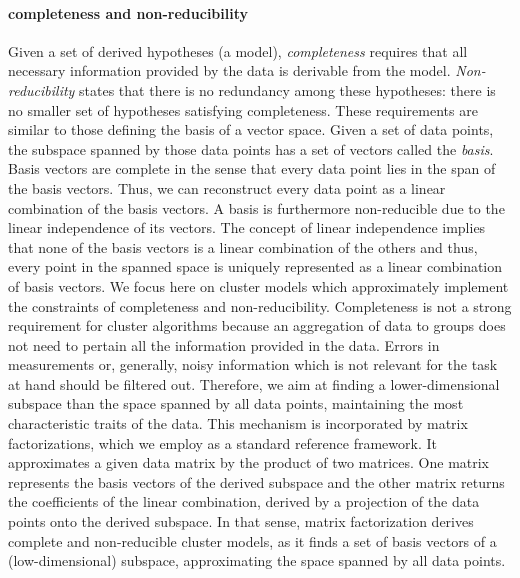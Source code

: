 \paragraph{completeness and non-reducibility} Given a set of derived hypotheses (a model), \emph{completeness} requires that all necessary information provided by the data is derivable from the model. \emph{Non-reducibility} states that there is no redundancy among these hypotheses: there is no smaller set of hypotheses satisfying completeness. These requirements are similar to those defining the basis of a vector space. Given a set of data points, the subspace spanned by those data points has a set of vectors called the \emph{basis}. Basis vectors are complete in the sense that every data point lies in the span of the basis vectors. Thus, we can reconstruct every data point as a linear combination of the basis vectors. A basis is furthermore non-reducible due to the linear independence of its vectors. The concept of linear independence implies that none of the basis vectors is a linear combination of the others and thus, every point in the spanned space is uniquely represented as a linear combination of basis vectors. 
We focus here on cluster models which approximately implement the constraints of completeness and non-reducibility.  Completeness is not a strong requirement for cluster algorithms because an aggregation of data to groups does not need to pertain all the information provided in the data. Errors in measurements or, generally, noisy information which is not relevant for the task at hand should be filtered out. Therefore, we aim at finding a lower-dimensional subspace than the space spanned by all data points, maintaining the most characteristic traits of the data. This mechanism is incorporated by matrix factorizations, which we employ as a standard reference framework. It approximates a given data matrix by the product of two matrices. One matrix represents the basis vectors of the derived subspace and the other matrix returns the coefficients of the linear combination, derived by a projection of the data points onto the derived subspace. In that sense, matrix factorization derives complete and non-reducible cluster models, as it finds a set of basis vectors of a (low-dimensional) subspace, approximating the space spanned by all data points.
